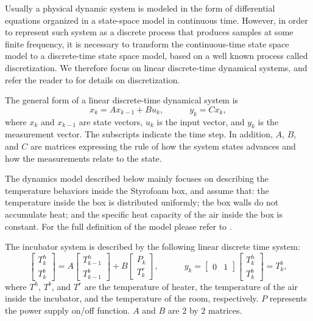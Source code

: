 Usually a physical dynamic system is modeled in the form of differential equations organized in a state-space model in continuous time.
However, in order to represent such system as a discrete process that produces samples at some finite frequency, it is necessary to transform the continuous-time state space model to a discrete-time state space model, based on a well known process called discretization.
We therefore focus on linear discrete-time dynamical systems, and refer the reader to \cite{Li2005} for details on discretization.

The general form of a linear discrete-time dynamical system is
\begin{equation} \label{equ:state_space_equation_discrete}
		{x}_k = A x_{k-1} + B u_k, \hspace{3em}
		y_k =C x_k,
\end{equation}
where $x_k$ and $x_{k-1}$ are state vectors, $u_k$ is the input vector, and $y_k$ is the measurement vector. 
The subscripts indicate the time step. 
In addition, $A$, $B$, and $C$ are matrices expressing the rule of how the system states advances and how the measurements relate to the state. 

The dynamics model described below mainly focuses on describing the temperature behaviors inside the Styrofoam box, and assume that:
the temperature inside the box is distributed uniformly; 
the box walls do not accumulate heat; 
and the specific heat capacity of the air inside the box is constant.
For the full definition of the model please refer to \cite{feng2021}.

\begin{example}\label{ex:incubator}
  The incubator system is described by the following linear discrete time system:
  \begin{equation} \label{equ:model_b}
     	\begin{bmatrix}
     		T^{h}_k\\
     		T^{b}_k
     	\end{bmatrix}
     	=
     	A
     	\begin{bmatrix}
     		T^{h}_{k-1}\\
     		T^{b}_{k-1}
     	\end{bmatrix}
     	+ B
     	\begin{bmatrix}
     		P_k\\
     		T^r_k
     	\end{bmatrix}, \hspace{3em}
    y_k =	
    	\begin{bmatrix}
    		0 & 1
    	\end{bmatrix}
    		\begin{bmatrix}
    				T^{h}_k\\
    				T^{b}_k
    		\end{bmatrix}
        = T^{b}_k,
  \end{equation}
  where $T^{h}$, $T^{b}$, and $T^{r}$ are the temperature of heater, the temperature of the air inside the incubator, and the temperature of the room, respectively. $P$ represents the power supply on/off function. $A$ and $B$ are $2$ by $2$ matrices. 
\end{example}


